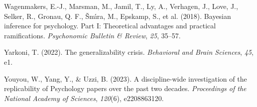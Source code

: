 \documentclass[
  letterpaper,
]{krantz}
\newlength{\cslhangindent}
\newenvironment{CSLReferences}[2] %
 {\begin{list}{}{%
  \setlength{\itemindent}{0pt}
  \setlength{\leftmargin}{0pt}
  \setlength{\parsep}{0pt}
  \ifodd #1
   \setlength{\leftmargin}{\cslhangindent}
   \setlength{\itemindent}{-1\cslhangindent}
  \fi
  \setlength{\itemsep}{#2\baselineskip}}}
 {\end{list}}
\begin{document}
\begin{CSLReferences}{1}{0}
Wagenmakers, E.-J., Marsman, M., Jamil, T., Ly, A., Verhagen, J., Love,
J., Selker, R., Gronau, Q. F., Šmı́ra, M., Epskamp, S., et al. (2018).
Bayesian inference for psychology. Part I: Theoretical advantages and
practical ramifications. \emph{Psychonomic Bulletin \& Review},
\emph{25}, 35--57.

Yarkoni, T. (2022). The generalizability crisis. \emph{Behavioral and
Brain Sciences}, \emph{45}, e1.

Youyou, W., Yang, Y., \& Uzzi, B. (2023). A discipline-wide
investigation of the replicability of Psychology papers over the past
two decades. \emph{Proceedings of the National Academy of Sciences},
\emph{120}(6), e2208863120.

\end{CSLReferences}
\end{document}
